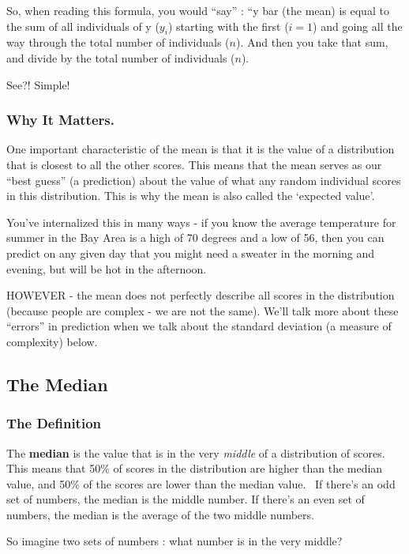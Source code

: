 \documentclass[
  letterpaper,
  DIV=11,
  numbers=noendperiod,
  oneside]{scrreprt}
\begin{document}
So, when reading this formula, you would ``say'' : ``y bar (the mean) is
equal to the sum of all individuals of y (\(y_i\)) starting with the
first (\(i=1\)) and going all the way through the total number of
individuals (\(n\)). And then you take that sum, and divide by the total
number of individuals (\(n\)).

See?! Simple!

\subsubsection{Why It Matters.}\label{why-it-matters.}

One important characteristic of the mean is that it is the value of a
distribution that is closest to all the other scores. This means that
the mean serves as our ``best guess'' (a prediction) about the value of
what any random individual scores in this distribution. This is why the
mean is also called the `expected value'.

You've internalized this in many ways - if you know the average
temperature for summer in the Bay Area is a high of 70 degrees and a low
of 56, then you can predict on any given day that you might need a
sweater in the morning and evening, but will be hot in the afternoon.

HOWEVER - the mean does not perfectly describe all scores in the
distribution (because people are complex - we are not the same). We'll
talk more about these ``errors'' in prediction when we talk about the
standard deviation (a measure of complexity) below.

\subsection{The Median}\label{the-median}

\subsubsection{The Definition}\label{the-definition}

The \textbf{median} is the value that is in the very \emph{middle} of a
distribution of scores. This means that 50\% of scores in the
distribution are higher than the median value, and 50\% of the scores
are lower than the median value.~ If there's an odd set of numbers, the
median is the middle number. If there's an even set of numbers, the
median is the average of the two middle numbers.~

So imagine two sets of numbers : what number is in the very middle?
\end{document}

